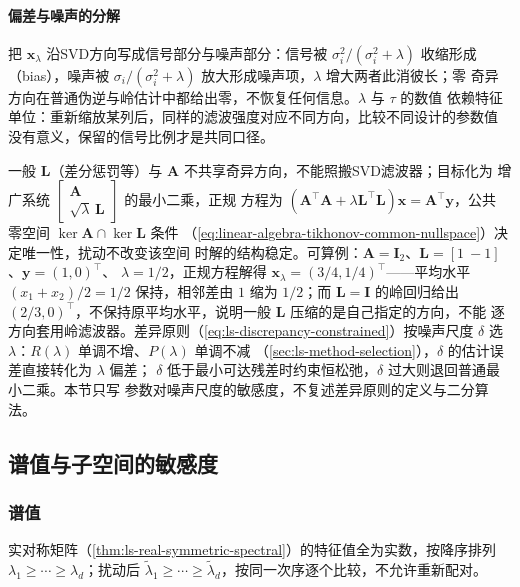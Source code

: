 \paragraph{偏差与噪声的分解}

把 $\bm x_\lambda$ 沿SVD方向写成信号部分与噪声部分：信号被
$\sigma_i^2/(\sigma_i^2+\lambda)$ 收缩形成（bias），噪声被
$\sigma_i/(\sigma_i^2+\lambda)$ 放大形成噪声项，$\lambda$ 增大两者此消彼长；零
奇异方向在普通伪逆与岭估计中都给出零，不恢复任何信息。$\lambda$ 与 $\tau$ 的数值
依赖特征单位：重新缩放某列后，同样的滤波强度对应不同方向，比较不同设计的参数值
没有意义，保留的信号比例才是共同口径。

一般 $\bm L$（差分惩罚等）与 $\bm A$ 不共享奇异方向，不能照搬SVD滤波器；目标化为
增广系统 $\begin{bmatrix}\bm A\\ \sqrt\lambda\,\bm L\end{bmatrix}$ 的最小二乘，正规
方程为 $(\bm A^\top\bm A+\lambda\bm L^\top\bm L)\bm x=\bm A^\top\bm y$，公共
零空间 $\ker\bm A\cap\ker\bm L$ 条件
（\ref{eq:linear-algebra-tikhonov-common-nullspace}）决定唯一性，扰动不改变该空间
时解的结构稳定。可算例：$\bm A=\bm I_2$、$\bm L=[1\ -1]$、$\bm y=(1,0)^\top$、
$\lambda=1/2$，正规方程解得 $\bm x_\lambda=(3/4,1/4)^\top$——平均水平
$(x_1+x_2)/2=1/2$ 保持，相邻差由 $1$ 缩为 $1/2$；而 $\bm L=\bm I$ 的岭回归给出
$(2/3,0)^\top$，不保持原平均水平，说明一般 $\bm L$ 压缩的是自己指定的方向，不能
逐方向套用岭滤波器。差异原则（\ref{eq:ls-discrepancy-constrained}）按噪声尺度
$\delta$ 选 $\lambda$：$R(\lambda)$ 单调不增、$P(\lambda)$ 单调不减
（\ref{sec:ls-method-selection}），$\delta$ 的估计误差直接转化为 $\lambda$ 偏差；
$\delta$ 低于最小可达残差时约束恒松弛，$\delta$ 过大则退回普通最小二乘。本节只写
参数对噪声尺度的敏感度，不复述差异原则的定义与二分算法。

\subsection{谱值与子空间的敏感度}
\label{sec:ls-spectral-sensitivity}
\label{sec:linear-algebra-spectral-stability}
\label{sec:ch06-spectral-stability}

\subsubsection{谱值}
\label{sec:ls-spectral-value-sensitivity}

实对称矩阵（\ref{thm:ls-real-symmetric-spectral}）的特征值全为实数，按降序排列
$\lambda_1\geq\cdots\geq\lambda_d$；扰动后 $\widetilde\lambda_1\geq\cdots
\geq\widetilde\lambda_d$，按同一次序逐个比较，不允许重新配对。

